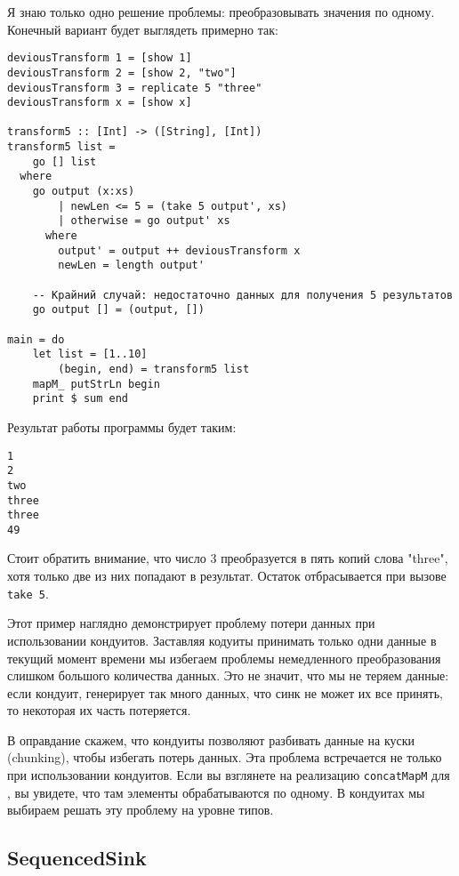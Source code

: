 Я знаю только одно решение проблемы: преобразовывать значения по одному. 
Конечный вариант будет выглядеть примерно так:
\begin{lstlisting}
deviousTransform 1 = [show 1]
deviousTransform 2 = [show 2, "two"]
deviousTransform 3 = replicate 5 "three"
deviousTransform x = [show x]

transform5 :: [Int] -> ([String], [Int])
transform5 list =
    go [] list
  where
    go output (x:xs)
        | newLen <= 5 = (take 5 output', xs)
        | otherwise = go output' xs
      where
        output' = output ++ deviousTransform x
        newLen = length output'

    -- Крайний случай: недостаточно данных для получения 5 результатов
    go output [] = (output, [])

main = do
    let list = [1..10]
        (begin, end) = transform5 list
    mapM_ putStrLn begin
    print $ sum end
\end{lstlisting}    
Результат работы программы будет таким:
\begin{verbatim}
1
2
two
three
three
49
\end{verbatim}
Стоит обратить внимание, что число 3 преобразуется в пять копий слова "three", 
хотя только две из них попадают в результат. Остаток отбрасывается при 
вызове \verb=take 5=.
 
Этот пример наглядно демонстрирует проблему потери данных при использовании 
кондуитов. Заставляя кодуиты принимать только одни данные в текущий момент 
времени мы избегаем проблемы немедленного преобразования слишком большого 
количества данных. Это не значит, что мы не теряем данные: если кондуит, 
генерирует так много данных, что синк не может их все принять, то некоторая их 
часть потеряется.
 
В оправдание скажем, что кондуиты позволяют разбивать данные на куски (chunking), 
чтобы избегать потерь данных.
Эта проблема встречается не только при использовании кондуитов. Если вы 
взглянете на реализацию \lstinline'concatMapM' для 
, вы увидете, что 
там элементы обрабатываются по одному. В кондуитах мы выбираем решать эту 
проблему на уровне типов.
 
\subsection{SequencedSink}
 
